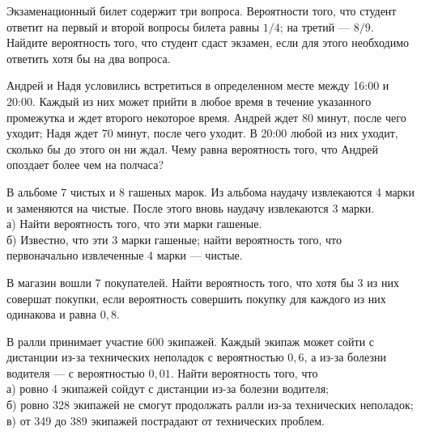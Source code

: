 \newpage\setcounter{zad}{0}



\begin{zkrW}{20}\noindent 
	Экзаменационный билет содержит три вопроса. Вероятности того, что студент ответит на первый и второй вопросы билета равны $1/4$; на третий --- $8/9$. Найдите вероятность того, что студент сдаст экзамен, если для этого необходимо ответить хотя бы на два вопроса.
 
\end{zkrW}

\begin{zkrW}{20}\noindent 
	Андрей и Надя условились встретиться в определенном месте между 16:00 и 20:00. Каждый из них может прийти в любое время в течение указанного промежутка и ждет второго некоторое время. Андрей ждет 80 минут, после чего уходит; Надя ждет 70 минут, после чего уходит. В 20:00 любой из них уходит, сколько бы до этого он ни ждал. Чему равна вероятность того, что Андрей опоздает более чем на полчаса?
 
\end{zkrW}

\begin{zkrW}{20}\noindent 
	В альбоме 7 чистых и 8 гашеных марок. Из альбома наудачу извлекаются 4 марки и заменяются на чистые. После этого вновь наудачу извлекаются 3 марки. \\ \indent а) Найти вероятность того, что эти марки гашеные. \\ \indent б) Известно, что эти 3 марки гашеные; найти вероятность того, что первоначально извлеченные 4 марки --- чистые.
 
\end{zkrW}

\begin{zkrW}{20}\noindent 
	В магазин вошли 7 покупателей. Найти вероятность того, что хотя бы 3 из них совершат покупки, если вероятность совершить покупку для каждого из них одинакова и равна $0{,}8$.
 
\end{zkrW}

\begin{zkrW}{20}\noindent 
	В ралли принимает участие 600 экипажей. Каждый экипаж может сойти с дистанции из-за технических неполадок с вероятностью $0{,}6$, а из-за болезни водителя --- с вероятностью $0{,}01$. Найти вероятность того, что \\ \indent а) ровно 4 экипажей сойдут с дистанции из-за болезни водителя; \\ \indent б) ровно 328 экипажей не смогут продолжать ралли из-за технических неполадок; \\ \indent в) от 349 до 389 экипажей пострадают от технических проблем.
 
\end{zkrW}

